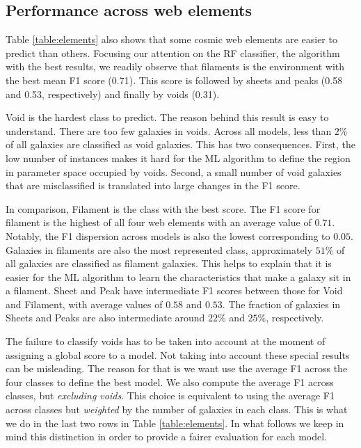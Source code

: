 \documentclass[usenatbib]{mnras}
\begin{document}
\subsection{Performance across web elements}

Table \ref{table:elements} also shows that some cosmic web elements 
are easier to predict than others.
Focusing our attention on the RF classifier, the algorithm with the
best results, we readily observe that filaments is the environment
with the best mean F1 score (0.71).
This score is followed by sheets and peaks (0.58 and 0.53,
respectively) and finally by voids (0.31).

Void is the hardest class to predict. 
The reason behind this result is easy to understand. 
There are too few galaxies in voids.
Across all models, less than $2\%$ of all galaxies
are classified as void galaxies.
This has two consequences.
First, the low number of instances makes it hard for the ML algorithm to
define the region in parameter space occupied by voids.
Second, a small number of void galaxies that are misclassified is translated into large changes in the F1 score.

In comparison, Filament is the class with the best score.
The F1 score for filament is the highest of all four
web elements with an average value of $0.71$.
Notably, the F1 dispersion across models is also the lowest corresponding to $0.05$.
Galaxies in filaments are also the most represented class,
approximately $51\%$ of all galaxies are classified as filament galaxies.
This helps to explain that it is easier for the ML algorithm to learn
the characteristics that make a galaxy sit in a filament.
Sheet and Peak have intermediate F1 scores between
those for Void and Filament, with average values of $0.58$ and $0.53$.
The fraction of galaxies in Sheets and Peaks are also intermediate around $22\%$ and $25\%$, respectively.

The failure to classify voids has to be taken into account at the
moment of assigning a global score to a model.
Not taking into account these special results can be misleading.
The reason for that is we want use the average F1 across the four classes to define the best model. 
We  also compute the average F1 across classes, but
\emph{excluding voids}.
This choice is equivalent to using the average F1 across classes but \emph{weighted} by the number of galaxies in each class.
This is what we do in the last two rows in Table \ref{table:elements}.
In what follows we keep in mind this distinction in order to provide a fairer evaluation for each model.
\end{document}
